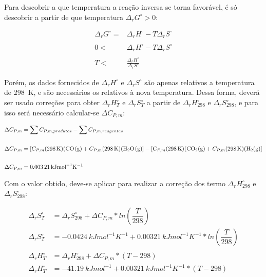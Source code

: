 Para descobrir a que temperatura a reação inversa se torna favorável, é só descobrir a partir de que temperatura \(\Delta_rG^\circ > 0\):

\begin{align*}
	\Delta_rG^\circ = &\Delta_rH^\circ - T \Delta_rS^\circ \\ \\
	0 < &\Delta_rH^\circ - T \Delta_rS^\circ \\ \\
	T < &\frac{\Delta_rH^\circ}{\Delta_rS^\circ}
\end{align*}

Porém, os dados fornecidos de \(\Delta_rH^\circ\)  e  \(\Delta_rS^\circ\) são apenas relativos a temperatura de \qty{298}{K}, e são necessários os relativos à nova temperatura. Dessa forma, deverá ser usado correções para obter \(\Delta_rH^\circ_{T}\) e \(\Delta_rS^\circ_{T}\)  a partir de \(\Delta_rH^\circ_{298}\) e \(\Delta_rS^\circ_{298} \), e para isso será necessário calcular-se \(\Delta C_{P,m}\):

 \begin{align*}
 	\Delta C_{P,m} &= \sum C_{P,m, produtos} - \sum C_{P,m, reagentes}\\ \\
 	\Delta C_{P,m} &= [C_{P,m} (\qty{298}{K}) (\ce{CO(g)} + C_{P,m} (\qty{298}{K}) (\ce{H2O(g)}] - [ C_{P,m} (\qty{298}{K}) (\ce{CO2(g)} + C_{P,m} (\qty{298}{K}) (\ce{H2(g)}]\\ \\
 	\Delta C_{P,m} &= \qty{0,00321}{kJmol^{-1}K^{-1}}
 \end{align*}
 
Com o valor obtido, deve-se aplicar para realizar a correção dos termo \(\Delta_rH^\circ_{298}\) e \(\Delta_rS^\circ_{298} \):

\begin{align*}
	\Delta_rS^\circ_{T} &= \Delta_rS^\circ_{298} +\Delta C_{P,m} * ln (\dfrac{T}{298}) \\
	\Delta_rS^\circ_{T} &= \qty{-0,0424}{kJmol^{-1}K^{-1}} +\qty{0,00321}{kJmol^{-1}K^{-1}} * ln (\dfrac{T}{298}) \\ \\
	\Delta_rH^\circ_{T} &= \Delta_rH^\circ_{298} +\Delta C_{P,m} *  (T - 298) \\
	\Delta_rH^\circ_{T} &= \qty{-41,19}{kJmol^{-1}} +\qty{0,00321}{kJmol^{-1}K^{-1}} *  (T - 298) \\
\end{align*}

